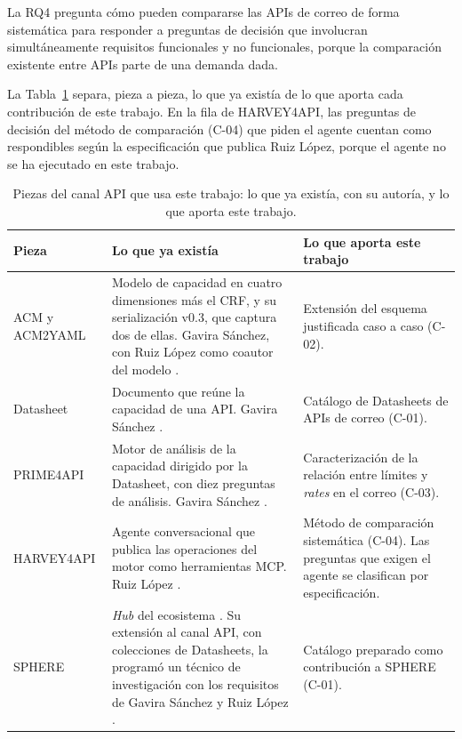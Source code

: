 La RQ4 pregunta cómo pueden compararse las APIs de correo de forma
sistemática para responder a preguntas de decisión que involucran
simultáneamente requisitos funcionales y no funcionales, porque la
comparación existente entre APIs parte de una demanda dada.

La Tabla~\ref{tab:estado:aportacion} separa, pieza a pieza,
lo que ya existía de lo que aporta cada contribución de este trabajo. En
la fila de HARVEY4API, las preguntas de decisión del método de
comparación (C-04) que piden el agente cuentan como respondibles según la
especificación que publica Ruiz López, porque el agente no se ha
ejecutado en este trabajo.

\begin{table}[H]
\centering
\small
\begin{tabular}{|>{\raggedright\arraybackslash}p{2.7cm}|>{\raggedright\arraybackslash}p{5.4cm}|>{\raggedright\arraybackslash}p{5.4cm}|}
\hline
\textbf{Pieza} & \textbf{Lo que ya existía} & \textbf{Lo que aporta este trabajo} \\
\hline
ACM y ACM2YAML &
Modelo de capacidad en cuatro dimensiones más el CRF, y su serialización
v0.3, que captura dos de ellas. Gavira Sánchez, con Ruiz López como
coautor del modelo \citep{gavira2026tfm,ruizlopez2026tfm}. &
Extensión del esquema justificada caso a caso (C-02). \\
\hline
Datasheet &
Documento que reúne la capacidad de una API. Gavira Sánchez
\citep{gavira2026tfm}. &
Catálogo de Datasheets de APIs de correo (C-01). \\
\hline
PRIME4API &
Motor de análisis de la capacidad dirigido por la Datasheet, con diez
preguntas de análisis. Gavira Sánchez \citep{gavira2026tfm}. &
Caracterización de la relación entre límites y \textit{rates} en el
correo (C-03). \\
\hline
HARVEY4API &
Agente conversacional que publica las operaciones del motor como
herramientas MCP. Ruiz López \citep{ruizlopez2026tfm}. &
Método de comparación sistemática (C-04). Las preguntas que exigen el
agente se clasifican por especificación. \\
\hline
SPHERE &
\textit{Hub} del ecosistema \citep{sphere}. Su extensión al canal API,
con colecciones de Datasheets, la programó un técnico de investigación
con los requisitos de Gavira Sánchez y Ruiz López
\citep{gavira2026tfm}. &
Catálogo preparado como contribución a SPHERE (C-01). \\
\hline
\end{tabular}
\caption{Piezas del canal API que usa este trabajo: lo que ya existía, con su autoría, y lo que aporta este trabajo.}
\label{tab:estado:aportacion}
\end{table}

